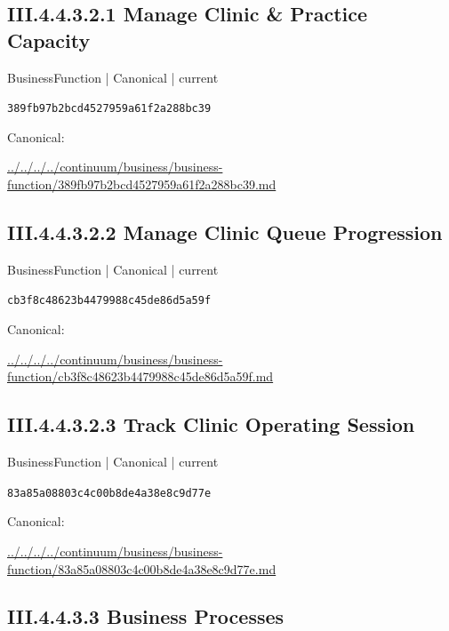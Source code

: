 \documentclass[10pt,a4paper]{article}
\begin{document}
\subsection*{III.4.4.3.2.1 Manage Clinic \& Practice Capacity}
\label{element-389fb97b2bcd4527959a61f2a288bc39}
{\small BusinessFunction | Canonical | current}\par
\texttt{389fb97b2bcd4527959a61f2a288bc39}\par
Canonical: \par
{\footnotesize\url{../../../../continuum/business/business-function/389fb97b2bcd4527959a61f2a288bc39.md}}\par
\subsection*{III.4.4.3.2.2 Manage Clinic Queue Progression}
\label{element-cb3f8c48623b4479988c45de86d5a59f}
{\small BusinessFunction | Canonical | current}\par
\texttt{cb3f8c48623b4479988c45de86d5a59f}\par
Canonical: \par
{\footnotesize\url{../../../../continuum/business/business-function/cb3f8c48623b4479988c45de86d5a59f.md}}\par
\subsection*{III.4.4.3.2.3 Track Clinic Operating Session}
\label{element-83a85a08803c4c00b8de4a38e8c9d77e}
{\small BusinessFunction | Canonical | current}\par
\texttt{83a85a08803c4c00b8de4a38e8c9d77e}\par
Canonical: \par
{\footnotesize\url{../../../../continuum/business/business-function/83a85a08803c4c00b8de4a38e8c9d77e.md}}\par
\subsection*{III.4.4.3.3 Business Processes}
\end{document}
